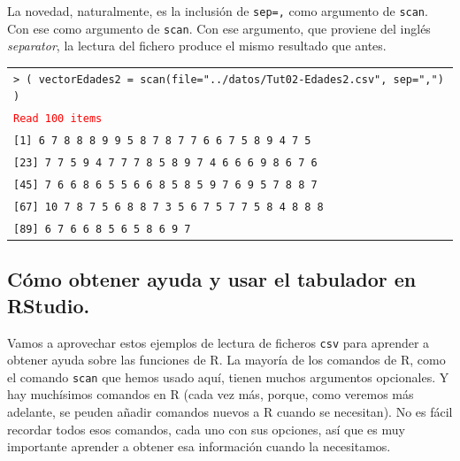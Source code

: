 \documentclass[10pt,a4paper]{article}\usepackage[]{graphicx}\usepackage[]{color}
\begin{document}
La novedad, naturalmente, es la inclusión de {\tt sep=,} como argumento de {\tt scan}.  Con ese  como argumento de {\tt scan}.  Con ese argumento, que proviene del inglés {\em separator}, la lectura del fichero produce el mismo resultado que antes.
\begin{center}
\begin{tabular}{l}
{\tt > ( vectorEdades2 = scan(file="../datos/Tut02-Edades2.csv", sep=",") )}\\
\textcolor{red}{\tt Read 100 items{}}\\
{\tt   [1]  6  7  8  8  8  9  9  5  8  7  8  7  7  6  6  7  5  8  9  4  7  5 }\\
{\tt  [23]  7  7  5  9  4  7  7  7  8  5  8  9  7  4  6  6  6  9  8  6  7  6 }\\
{\tt  [45]  7  6  6  8  6  5  5  6  6  8  5  8  5  9  7  6  9  5  7  8  8  7 }\\
{\tt  [67] 10  7  8  7  5  6  8  8  7  3  5  6  7  5  7  7  5  8  4  8  8  8 }\\
{\tt  [89]  6  7  6  6  8  5  6  5  8  6  9  7 }
\end{tabular}
\end{center}



\subsection{Cómo obtener ayuda y usar el tabulador en RStudio.}

Vamos a aprovechar estos ejemplos de lectura de ficheros {\tt csv} para aprender a obtener ayuda sobre las funciones de R. La mayoría de los comandos de R, como el comando {\tt scan} que hemos usado aquí, tienen muchos argumentos opcionales. Y hay muchísimos comandos en R (cada vez más, porque, como veremos más adelante, se peuden añadir comandos nuevos a R cuando se necesitan). No es fácil recordar todos esos comandos, cada uno con sus opciones, así que es muy importante aprender a obtener esa información cuando la necesitamos.
\end{document}
